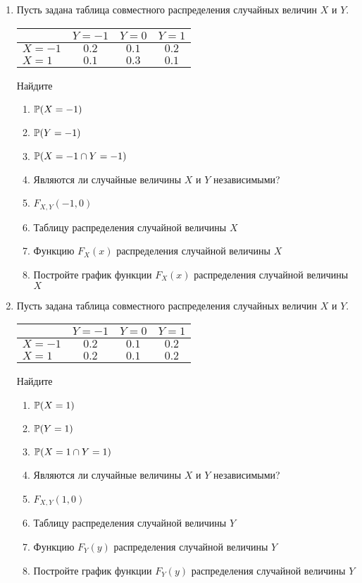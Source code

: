 \begin{enumerate}
\item Пусть задана таблица совместного распределения случайных величин $X$ и $Y$.

\begin{center}
\begin{tabular}{lccc}
\toprule
                       & $Y=-1$  & $Y=0$   & $Y=1$   \\ \midrule
$X=-1$                 & $0.2$ & $0.1$ & $0.2$ \\
 $X=1$                 & $0.1$ & $0.3$ & $0.1$ \\ \bottomrule
\end{tabular}
\end{center}

Найдите
\begin{enumerate}
\item $\P(X = -1)$
\item $\P(Y = -1)$
\item $\P(X = -1 \cap Y = -1 )$
\item Являются ли случайные величины $X$ и $Y$ независимыми?
\item $F_{X,Y}(-1,0)$
\item Таблицу распределения случайной величины $X$
\item Функцию $F_{X}(x)$ распределения случайной величины $X$
\item Постройте график функции $F_{X}(x)$ распределения случайной величины $X$
\end{enumerate}

\item Пусть задана таблица совместного распределения случайных величин $X$ и $Y$.

\begin{center}
\begin{tabular}{lccc}
\toprule
                       & $Y=-1$  & $Y=0$  & $Y=1$   \\ \midrule
$X=-1$                 & $0.2$ & $0.1$ & $0.2$ \\
 $X=1$                 & $0.2$ & $0.1$ & $0.2$ \\ \bottomrule
\end{tabular}
\end{center}

Найдите
\begin{enumerate}
\item $\P(X = 1)$
\item $\P(Y = 1)$
\item $\P(X = 1 \cap Y = 1)$
\item Являются ли случайные величины $X$ и $Y$ независимыми?
\item $F_{X,Y}(1,0)$
\item Таблицу распределения случайной величины $Y$
\item Функцию $F_{Y}(y)$ распределения случайной величины $Y$
\item Постройте график функции $F_{Y}(y)$ распределения случайной величины $Y$
\end{enumerate}


\end{enumerate}
